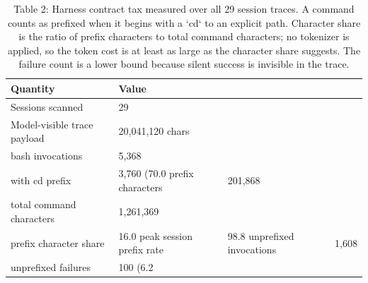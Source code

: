 \begin{table}[t]
\centering
\caption{Table 2: Harness contract tax measured over all 29 session traces. A command counts as prefixed when it begins with a `cd` to an explicit path. Character share is the ratio of prefix characters to total command characters; no tokenizer is applied, so the token cost is at least as large as the character share suggests. The failure count is a lower bound because silent success is invisible in the trace.}
\label{tab:harness_tax}
\begin{tabular}{ll}
\toprule
\textbf{Quantity} & \textbf{Value} \\
\midrule
Sessions scanned & 29 \\
Model-visible trace payload & 20,041,120 chars \\
bash invocations & 5,368 \\
with cd prefix & 3,760 (70.0%
prefix characters & 201,868 \\
total command characters & 1,261,369 \\
prefix character share & 16.0%
peak session prefix rate & 98.8%
unprefixed invocations & 1,608 \\
unprefixed failures & 100 (6.2%
\bottomrule
\end{tabular}
\end{table}
